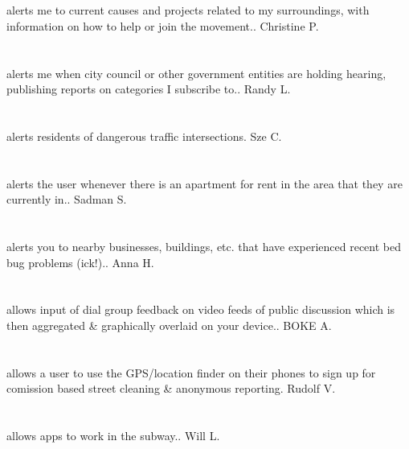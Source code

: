 \section{} alerts me to current causes and projects related to my surroundings,  with information on how to help or join the movement.. Christine P.
\section{} alerts me when city council or other government entities are holding hearing,  publishing reports on categories I subscribe to.. Randy L.
\section{}alerts residents of dangerous traffic intersections. Sze C.
\section{} alerts the user whenever there is an apartment for rent in the area that they are currently in.. Sadman S.
\section{}  alerts you to nearby businesses,  buildings,  etc. that have experienced recent bed bug problems (ick!).. Anna H.
\section{}allows  input of  dial group feedback on video feeds of public discussion which is then aggregated \& graphically overlaid  on your device.. BOKE A.
\section{}allows a user to use the GPS/location finder on their phones to sign up for comission based street cleaning \& anonymous reporting. Rudolf V.
\section{}allows apps to work in the subway.. Will L.

